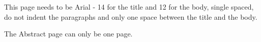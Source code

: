 This page needs to be Arial - 14 for the title and 12 for the body, single spaced, do not indent the paragraphs and only one space between the title and the body. \newline 

The Abstract page can only be one page.


